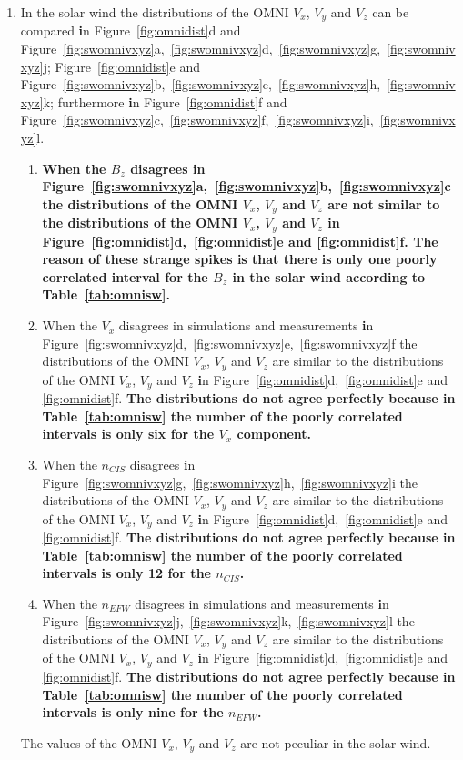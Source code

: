 \documentclass[linenumbers,draft]{agujournal}
\begin{document}
\begin{enumerate}
\item In the solar wind the distributions of the OMNI $V_{x}$, $V_{y}$ and $V_{z}$ can be compared \textbf{i}n Figure~\ref{fig:omnidist}d and Figure~\ref{fig:swomnivxyz}a,~\ref{fig:swomnivxyz}d,~\ref{fig:swomnivxyz}g,~\ref{fig:swomnivxyz}j; Figure~\ref{fig:omnidist}e and Figure~\ref{fig:swomnivxyz}b,~\ref{fig:swomnivxyz}e,~\ref{fig:swomnivxyz}h,~\ref{fig:swomnivxyz}k; furthermore \textbf{i}n Figure~\ref{fig:omnidist}f and Figure~\ref{fig:swomnivxyz}c,~\ref{fig:swomnivxyz}f,~\ref{fig:swomnivxyz}i,~\ref{fig:swomnivxyz}l.
\begin{enumerate} 
\item \textbf{When the $B_{z}$ disagrees \textbf{i}n Figure~\ref{fig:swomnivxyz}a,~\ref{fig:swomnivxyz}b,~\ref{fig:swomnivxyz}c the distributions of the OMNI $V_{x}$, $V_{y}$ and $V_{z}$ are not similar to the distributions of the OMNI $V_{x}$, $V_{y}$ and $V_{z}$ \textbf{i}n Figure~\ref{fig:omnidist}d,~\ref{fig:omnidist}e and \ref{fig:omnidist}f. The reason of these strange spikes is that there is only one poorly correlated interval for the $B_{z}$ in the solar wind according to Table~\ref{tab:omnisw}.}

\item When the $V_{x}$ disagrees in simulations and measurements \textbf{i}n Figure~\ref{fig:swomnivxyz}d,~\ref{fig:swomnivxyz}e,~\ref{fig:swomnivxyz}f the distributions of the OMNI $V_{x}$, $V_{y}$ and $V_{z}$ are similar to the distributions of the OMNI $V_{x}$, $V_{y}$ and $V_{z}$ \textbf{i}n Figure~\ref{fig:omnidist}d,~\ref{fig:omnidist}e and \ref{fig:omnidist}f. \textbf{The distributions do not agree perfectly because in Table~\ref{tab:omnisw} the number of the poorly correlated intervals is only six for the $V_{x}$ component.}
 
\item When the $n_{CIS}$ disagrees \textbf{i}n Figure~\ref{fig:swomnivxyz}g,~\ref{fig:swomnivxyz}h,~\ref{fig:swomnivxyz}i the distributions of the OMNI $V_{x}$, $V_{y}$ and $V_{z}$ are similar to the distributions of the OMNI $V_{x}$, $V_{y}$ and $V_{z}$ \textbf{i}n Figure~\ref{fig:omnidist}d,~\ref{fig:omnidist}e and \ref{fig:omnidist}f. \textbf{The distributions do not agree perfectly because in Table~\ref{tab:omnisw} the number of the poorly correlated intervals is only 12 for the $n_{CIS}$.}

\item When the $n_{EFW}$ disagrees in simulations and measurements \textbf{i}n Figure~\ref{fig:swomnivxyz}j,~\ref{fig:swomnivxyz}k,~\ref{fig:swomnivxyz}l the distributions of the OMNI $V_{x}$, $V_{y}$ and $V_{z}$ are similar to the distributions of the OMNI $V_{x}$, $V_{y}$ and $V_{z}$ \textbf{i}n Figure~\ref{fig:omnidist}d,~\ref{fig:omnidist}e and \ref{fig:omnidist}f. \textbf{The distributions do not agree perfectly because in Table~\ref{tab:omnisw} the number of the poorly correlated intervals is only nine for the $n_{EFW}$.}
\end{enumerate}
 The values of the OMNI $V_{x}$, $V_{y}$ and $V_{z}$ are not peculiar in the solar wind. 
  

\end{enumerate}
\end{document}
